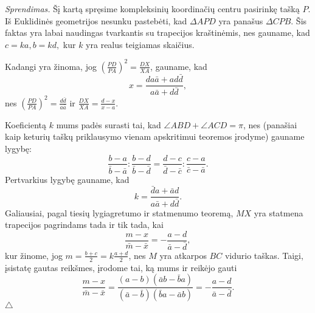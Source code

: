 \documentclass[11pt,a4paper,twoside]{book}
\newenvironment{sprendimas}{\noindent \textit{Sprendimas.}}{\hfill $\triangle$}
\theoremstyle{definition} \newtheorem*{api}{Apibrėžimas}
\theoremstyle{remark} \newtheorem*{pastaba}{Pastaba}
\begin{document}
\begin{sprendimas}
Šį kartą spręsime kompleksinių koordinačių centru pasirinkę tašką $P$. Iš Euklidinės geometrijos
nesunku pastebėti, kad $\Delta APD$ yra panašus $\Delta CPB$. Šis faktas yra labai naudingas tvarkantis su trapecijos kraštinėmis, nes gauname, kad $c=ka,  b=kd,$ kur $k$ yra realus teigiamas skaičius.

Kadangi yra žinoma, jog $ ( \frac {PD}{PA})^2 = \frac {DX}{XA} $, gauname, kad 
$$ x = \frac { da \bar a + ad \bar d }{ a \bar a + d \bar d},$$
nes $ ( \frac {PD}{PA})^2 =\frac {d \bar d} {a \bar a} $ ir $\frac {DX}{XA} = \frac{d-x}{x-a}.$

Koeficientą $k$ mums padės surasti tai, kad $ \angle ABD + \angle ACD = \pi $, nes (panašiai kaip keturių taškų priklausymo vienam apskritimui teoremos įrodyme) gauname lygybę:
$$\frac {b-a}{\bar b - \bar a} : \frac { b-d}{\bar b - \bar d} =  \frac {d-c}{\bar d - \bar c} : \frac { c-a}{\bar c- \bar a}.$$
Pertvarkius lygybę gauname, kad 
$$ k =  \frac { \bar d a + \bar a d }{a \bar a + d \bar d}. $$
Galiausiai, pagal tiesių lygiagretumo ir statmenumo teoremą, $MX$ yra statmena trapecijos pagrindams tada ir tik tada, kai
 $$  \frac {m-x}{ \bar m - \bar x} = - \frac {a - d}{ \bar a - \bar d},$$
kur žinome, jog $ m =\frac{b+c}{2}= k \frac { a+d} { 2} $, nes $M$ yra atkarpos $BC$ vidurio taškas. Taigi, įsistatę gautas reikšmes, įrodome tai, ką mums ir reikėjo gauti
$$ \frac {m-x}{ \bar m - \bar x}= 
\frac {(a-b)( \bar a b - \bar b a) }{(\bar a- \bar b)( \bar b a - \bar a b) } = - \frac {a - d}{ \bar a - \bar d}.$$
\end{sprendimas}
\end{document}
